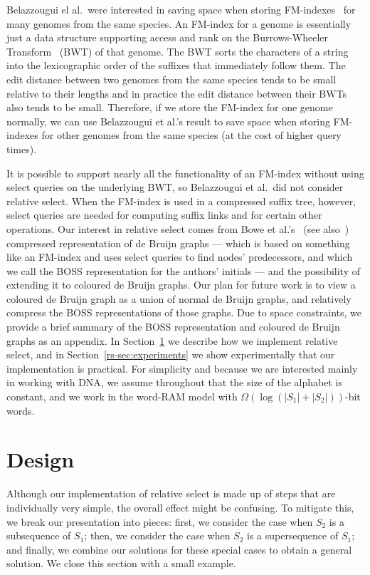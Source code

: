 Belazzougui el al.\ were interested in saving space when storing FM-indexes~\cite{FM05} for many genomes from the same species.  An FM-index for a genome is essentially just a data structure supporting access and rank on the Burrows-Wheeler Transform~\cite{BW94} (BWT) of that genome.  The BWT sorts the characters of a string into the lexicographic order of the suffixes that immediately follow them.  The edit distance between two genomes from the same species tends to be small relative to their lengths and in practice the edit distance between their BWTs also tends to be small.  Therefore, if we store the FM-index for one genome normally, we can use Belazzougui et al.'s result to save space when storing FM-indexes for other genomes from the same species (at the cost of higher query times).

It is possible to support nearly all the functionality of an FM-index without using select queries on the underlying BWT, so Belazzougui et al.\ did not consider relative select.  When the FM-index is used in a compressed suffix tree, however, select queries are needed for computing suffix links and for certain other operations.  Our interest in relative select comes from Bowe et al.'s~\cite{BOSS12} (see also~\cite{BBGPS15}) compressed representation of de Bruijn graphs --- which is based on something like an FM-index and uses select queries to find nodes' predecessors, and which we call the BOSS representation for the authors' initials --- and the possibility of extending it to coloured de Bruijn graphs.  Our plan for future work is to view a coloured de Bruijn graph as a union of normal de Bruijn graphs, and relatively compress the BOSS representations of those graphs.  Due to space constraints, we provide a brief summary of the BOSS representation and coloured de Bruijn graphs as an appendix.  In Section~\ref{rs-sec:design} we describe how we implement relative select, and in Section~\ref{rs-sec:experiments} we show experimentally that our implementation is practical.  For simplicity and because we are interested mainly in working with DNA, we assume throughout that the size of the alphabet is constant, and we work in the word-RAM model with \(\Omega (\log (|S_1| + |S_2|))\)-bit words.

\section{Design}
\label{rs-sec:design}

Although our implementation of relative select is made up of steps that are individually very simple, the overall effect might be confusing.  To mitigate this, we break our presentation into pieces: first, we consider the case when $S_2$ is a subsequence of $S_1$; then, we consider the case when $S_2$ is a supersequence of $S_1$; and finally, we combine our solutions for these special cases to obtain a general solution.  We close this section with a small example.

